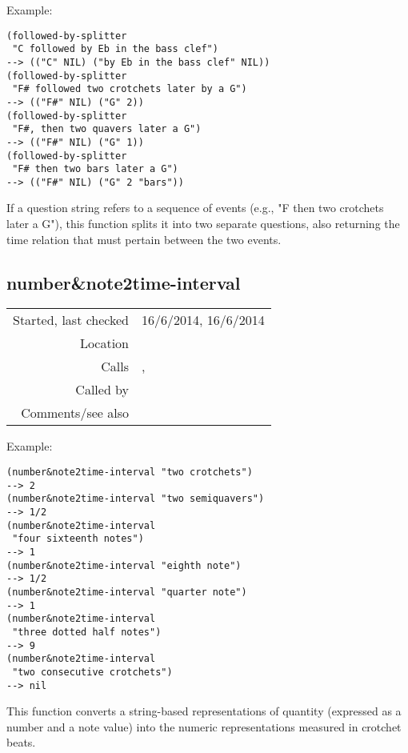 \vspace{0.5cm}
\noindent Example:
\begin{verbatim}
(followed-by-splitter
 "C followed by Eb in the bass clef")
--> (("C" NIL) ("by Eb in the bass clef" NIL))
(followed-by-splitter
 "F# followed two crotchets later by a G")
--> (("F#" NIL) ("G" 2))
(followed-by-splitter
 "F#, then two quavers later a G")
--> (("F#" NIL) ("G" 1))
(followed-by-splitter
 "F# then two bars later a G")
--> (("F#" NIL) ("G" 2 "bars"))
\end{verbatim}

\noindent If a question string refers to a sequence of
events (e.g., "F then two crotchets later a G"), this
function splits it into two separate questions, also
returning the time relation that must pertain between
the two events.


\subsection*{number\&note2time-interval}\label{fun:number-n-note2time-interval}

\vspace{0.3cm}
\begin{tabular}{r|p{8cm}}
Started, last checked & 16/6/2014, 16/6/2014 \\
Location & \nameref{sec:analytic-string-manipulations} \\
Calls & \nameref{fun:duration-string2numeric},\newline \nameref{fun:number-string2numeric} \\
Called by & \nameref{fun:modify-by-later} \\
Comments/see also &
\end{tabular}

\vspace{0.5cm}
\noindent Example:
\begin{verbatim}
(number&note2time-interval "two crotchets")
--> 2
(number&note2time-interval "two semiquavers")
--> 1/2
(number&note2time-interval
 "four sixteenth notes")
--> 1
(number&note2time-interval "eighth note")
--> 1/2
(number&note2time-interval "quarter note")
--> 1
(number&note2time-interval
 "three dotted half notes")
--> 9
(number&note2time-interval
 "two consecutive crotchets")
--> nil
\end{verbatim}

\noindent This function converts a string-based
representations of quantity (expressed as a number and
a note value) into the numeric representations
measured in crotchet beats.


